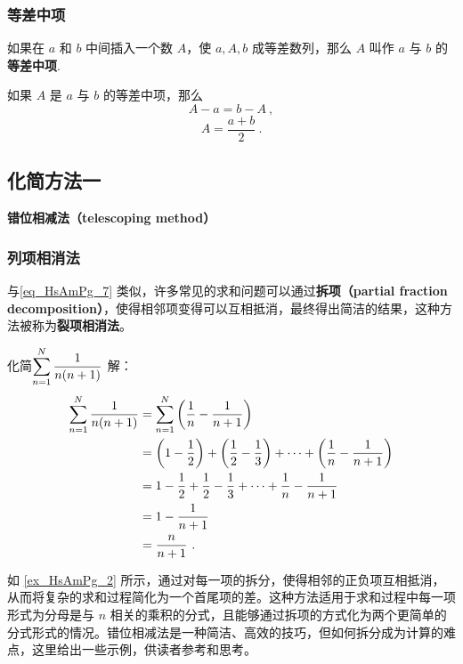 \subsubsection{等差中项}

如果在 $a$ 和 $b$ 中间插入一个数 $A$，使 $a,A,b$ 成等差数列，那么 $A$ 叫作 $a$ 与 $b$ 的\textbf{等差中项}.

如果 $A$ 是 $a$ 与 $b$ 的等差中项，那么
\begin{equation}
A - a = b - A~,
\end{equation}
\begin{equation}
A = \frac{a+b}{2}~.
\end{equation}

\subsection{化简方法一}
\textbf{错位相减法（telescoping method）}
\subsubsection{列项相消法}
与\autoref{eq_HsAmPg_7} 类似，许多常见的求和问题可以通过\textbf{拆项（partial fraction decomposition）}，使得相邻项变得可以互相抵消，最终得出简洁的结果，这种方法被称为\textbf{裂项相消法}。
\begin{example}{化简$\displaystyle\sum_{n=1}^N {1\over n(n+1)}$}\label{ex_HsAmPg_2}
解：
\begin{equation}
\begin{split}
\sum_{n=1}^N {1\over n(n+1)}&=\sum_{n=1}^N \left({1\over n}-{1\over n+1}\right)\\
&=\left(1-{1\over2}\right)+\left({1\over2}-{1\over3}\right)+\cdots+\left({1\over n}-{1\over n+1}\right)\\
&=1-{1\over2}+{1\over2}-{1\over3}+\cdots+{1\over n}-{1\over n+1}\\
&=1-{1\over n+1}\\
&={n\over n+1}~.\\
\end{split}
\end{equation}
\end{example}

如 \autoref{ex_HsAmPg_2} 所示，通过对每一项的拆分，使得相邻的正负项互相抵消，从而将复杂的求和过程简化为一个首尾项的差。这种方法适用于求和过程中每一项形式为分母是与 $n$ 相关的乘积的分式，且能够通过拆项的方式化为两个更简单的分式形式的情况。错位相减法是一种简洁、高效的技巧，但如何拆分成为计算的难点，这里给出一些示例，供读者参考和思考。


